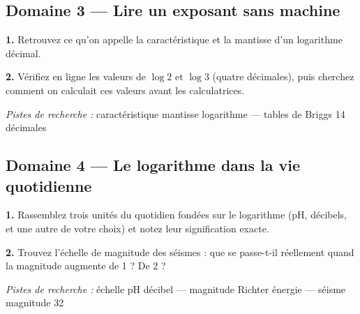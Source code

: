\documentclass[11pt,a4paper]{article}
\newcommand{\champ}[1]{\makebox[#1]{\dotfill}}
\begin{document}
\subsection*{Domaine 3 --- Lire un exposant sans machine}
\textbf{1.} Retrouvez ce qu'on appelle la caractéristique et la mantisse d'un logarithme décimal.
\par\smallskip
\textbf{2.} Vérifiez en ligne les valeurs de $\log 2$ et $\log 3$ (quatre décimales), puis cherchez comment on calculait ces valeurs avant les calculatrices.
\par\smallskip
{\small\emph{Pistes de recherche :} caractéristique mantisse logarithme --- tables de Briggs 14 décimales}
\par\smallskip
\noindent\makebox[\linewidth]{\dotfill}\par\vspace{1em}
\noindent\makebox[\linewidth]{\dotfill}\par\vspace{1em}
\par\smallskip{\small Sources : \champ{0.96\linewidth}}\par\medskip
\subsection*{Domaine 4 --- Le logarithme dans la vie quotidienne}
\textbf{1.} Rassemblez trois unités du quotidien fondées sur le logarithme (pH, décibels, et une autre de votre choix) et notez leur signification exacte.
\par\smallskip
\textbf{2.} Trouvez l'échelle de magnitude des séismes : que se passe-t-il réellement quand la magnitude augmente de 1 ? De 2 ?
\par\smallskip
{\small\emph{Pistes de recherche :} échelle pH décibel --- magnitude Richter énergie --- séisme magnitude 32}
\par\smallskip
\noindent\makebox[\linewidth]{\dotfill}\par\vspace{1em}
\noindent\makebox[\linewidth]{\dotfill}\par\vspace{1em}
\par\smallskip{\small Sources : \champ{0.96\linewidth}}\par\medskip
\end{document}
